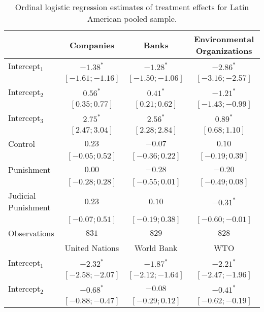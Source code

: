 \begin{table}[h]
\begin{center}
\caption{Ordinal logistic regression estimates of treatment effects for Latin American pooled sample.}
\begin{threeparttable}
\begin{tabular}{l c c c}
\hline
 & Companies & Banks & Environmental
Organizations \\
\hline
Intercept$_1$       & $-1.38^{*}$       & $-1.28^{*}$       & $-2.86^{*}$       \\
                    & $ [-1.61; -1.16]$ & $ [-1.50; -1.06]$ & $ [-3.16; -2.57]$ \\
Intercept$_2$       & $0.56^{*}$        & $0.41^{*}$        & $-1.21^{*}$       \\
                    & $ [ 0.35;  0.77]$ & $ [ 0.21;  0.62]$ & $ [-1.43; -0.99]$ \\
Intercept$_3$       & $2.75^{*}$        & $2.56^{*}$        & $0.89^{*}$        \\
                    & $ [ 2.47;  3.04]$ & $ [ 2.28;  2.84]$ & $ [ 0.68;  1.10]$ \\
Control             & $0.23$            & $-0.07$           & $0.10$            \\
                    & $ [-0.05;  0.52]$ & $ [-0.36;  0.22]$ & $ [-0.19;  0.39]$ \\
Punishment          & $0.00$            & $-0.28$           & $-0.20$           \\
                    & $ [-0.28;  0.28]$ & $ [-0.55;  0.01]$ & $ [-0.49;  0.08]$ \\
Judicial Punishment & $0.23$            & $0.10$            & $-0.31^{*}$       \\
                    & $ [-0.07;  0.51]$ & $ [-0.19;  0.38]$ & $ [-0.60; -0.01]$ \\
\hline
Observations        & $831$             & $829$             & $828$             \\
\hline
 & United Nations & World Bank & WTO \\
\hline
Intercept$_1$       & $-2.32^{*}$       & $-1.87^{*}$       & $-2.21^{*}$       \\
                    & $ [-2.58; -2.07]$ & $ [-2.12; -1.64]$ & $ [-2.47; -1.96]$ \\
Intercept$_2$       & $-0.68^{*}$       & $-0.08$           & $-0.41^{*}$       \\
                    & $ [-0.88; -0.47]$ & $ [-0.29;  0.12]$ & $ [-0.62; -0.19]$ \\

\end{tabular}
\end{threeparttable}
\end{center}
\end{table}
